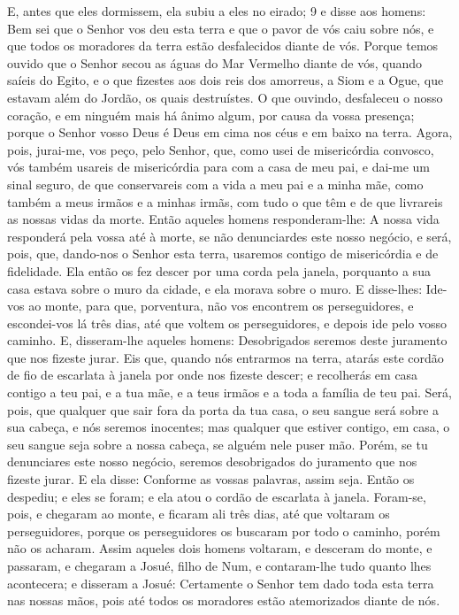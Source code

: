 E, antes que eles dormissem, ela subiu a eles no eirado; 9 e disse
aos homens: Bem sei que o Senhor vos deu esta terra e que o pavor de
vós caiu sobre nós, e que todos os moradores da terra estão
desfalecidos diante de vós. Porque temos ouvido que o Senhor
secou as águas do Mar Vermelho diante de vós, quando saíeis do
Egito, e o que fizestes aos dois reis dos amorreus, a Siom e a Ogue,
que estavam além do Jordão, os quais destruístes. O que
ouvindo, desfaleceu o nosso coração, e em ninguém mais há ânimo
algum, por causa da vossa presença; porque o Senhor vosso Deus é
Deus em cima nos céus e em baixo na terra. Agora, pois,
jurai-me, vos peço, pelo Senhor, que, como usei de misericórdia
convosco, vós também usareis de misericórdia para com a casa de meu
pai, e dai-me um sinal seguro, de que conservareis com a vida
a meu pai e a minha mãe, como também a meus irmãos e a minhas irmãs,
com tudo o que têm e de que livrareis as nossas vidas da morte.
Então aqueles homens responderam-lhe: A nossa vida responderá
pela vossa até à morte, se não denunciardes este nosso negócio, e
será, pois, que, dando-nos o Senhor esta terra, usaremos contigo de
misericórdia e de fidelidade. Ela então os fez descer por uma
corda pela janela, porquanto a sua casa estava sobre o muro da
cidade, e ela morava sobre o muro. E disse-lhes: Ide-vos ao
monte, para que, porventura, não vos encontrem os perseguidores, e
escondei-vos lá três dias, até que voltem os perseguidores, e depois
ide pelo vosso caminho. E, disseram-lhe aqueles homens:
Desobrigados seremos deste juramento que nos fizeste jurar.
Eis que, quando nós entrarmos na terra, atarás este cordão de
fio de escarlata à janela por onde nos fizeste descer; e recolherás
em casa contigo a teu pai, e a tua mãe, e a teus irmãos e a toda a
família de teu pai. Será, pois, que qualquer que sair fora da
porta da tua casa, o seu sangue será sobre a sua cabeça, e nós
seremos inocentes; mas qualquer que estiver contigo, em casa, o seu
sangue seja sobre a nossa cabeça, se alguém nele puser mão.
Porém, se tu denunciares este nosso negócio, seremos
desobrigados do juramento que nos fizeste jurar. E ela disse:
Conforme as vossas palavras, assim seja. Então os despediu; e eles
se foram; e ela atou o cordão de escarlata à janela.
Foram-se, pois, e chegaram ao monte, e ficaram ali três dias,
até que voltaram os perseguidores, porque os perseguidores os
buscaram por todo o caminho, porém não os acharam. Assim
aqueles dois homens voltaram, e desceram do monte, e passaram, e
chegaram a Josué, filho de Num, e contaram-lhe tudo quanto lhes
acontecera; e disseram a Josué: Certamente o Senhor tem dado
toda esta terra nas nossas mãos, pois até todos os moradores estão
atemorizados diante de nós.


